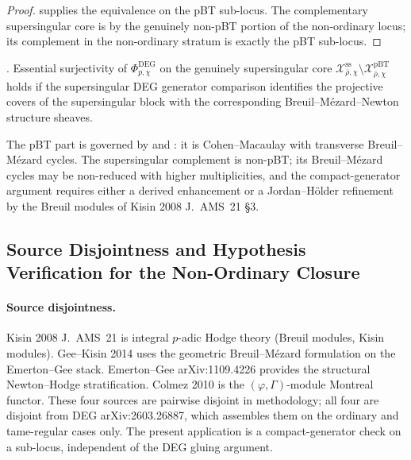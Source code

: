 \begin{proof}
 supplies the equivalence
on the pBT sub-locus. The complementary supersingular core is
by  the genuinely
non-pBT portion of the non-ordinary locus; its complement in
the non-ordinary stratum is exactly the pBT sub-locus.
\end{proof}

\begin{conjecture}
\label{v4-arith:w6-e:conj:f1a1-ss-residual}
\ClaimStatusConjectured. Essential surjectivity of
\(\Phi^{\mathrm{DEG}}_{p,\chi}\) on the genuinely supersingular core
\(\mathcal{X}^{\mathrm{ss}}_{\bar\rho,\chi}\setminus
\mathcal{X}^{\mathrm{pBT}}_{\bar\rho,\chi}\) holds if the
supersingular DEG generator comparison identifies the projective covers
of the supersingular block with the corresponding
Breuil--M{\'e}zard--Newton structure sheaves.
\end{conjecture}

\begin{remark}
\label{v4-arith:w6-e:rem:ss-narrower}
The pBT part is governed by
 and
: it is Cohen--Macaulay with
transverse Breuil--M{\'e}zard cycles. The supersingular complement is
non-pBT; its Breuil--M{\'e}zard cycles may be
non-reduced with higher multiplicities, and the compact-generator
argument requires either a derived enhancement or a
Jordan--H{\"o}lder refinement by the Breuil modules of
Kisin 2008 J.~AMS~21 \S 3.
\end{remark}

\subsection{Source Disjointness and Hypothesis Verification for the Non-Ordinary Closure}

\paragraph{Source disjointness.} Kisin 2008 J.~AMS~21 is integral
\(p\)-adic Hodge theory (Breuil modules, Kisin modules). Gee--Kisin 2014
uses the geometric Breuil--M{\'e}zard formulation on the Emerton--Gee
stack. Emerton--Gee arXiv:1109.4226 provides the structural Newton--Hodge
stratification. Colmez 2010 is the \((\varphi,\Gamma)\)-module Montreal
functor. These four sources are pairwise disjoint in methodology; all four
are disjoint from DEG arXiv:2603.26887, which assembles them on the ordinary
and tame-regular cases only. The present application is a compact-generator
check on a sub-locus, independent of the DEG gluing argument.


